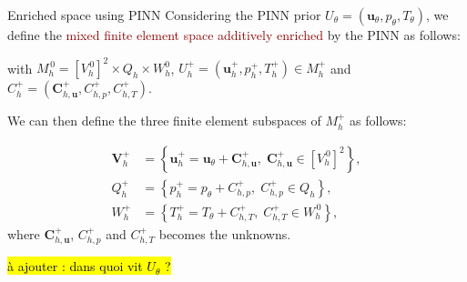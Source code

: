\begin{frame}{Enriched space using PINN} %
    Considering the PINN prior $U_\theta = (\bm{u}_\theta, p_\theta, T_\theta)$, we define the \textcolor{darkred}{mixed finite element space additively enriched} by the PINN as follows:
    
    \begin{center}
    \end{center}

    with $M_h^{\, 0}=[V_h^{\, 0}]^2 \times Q_h \times W_h^0$,
    $U_h^+ = (\bm{u}_h^+, p_h^+, T_h^+) \in M_h^+$ and $C_h^+ = (\bm{C}_{h,\bm{u}}^+, C_{h,p}^+, C_{h,T}^+)$.

    \vspace{8pt}

    We can then define the three finite element subspaces of $M_h^+$ as follows:
    \begin{minipage}{0.6\linewidth}
        \vspace{-15pt}
        \begin{align*}
            \bm{V}_h^+ &= \left\{\bm{u}_h^+ = \bm{u}_\theta + \bm{C}_{h,\bm{u}}^+, \; \bm{C}_{h,\bm{u}}^+ \in [V_h^{\, 0}]^2\right\}, \\
            Q_h^+ &= \left\{p_h^+ = p_\theta + C_{h,p}^+, \; C_{h,p}^+ \in Q_h\right\}, \\
            W_h^+ &= \left\{T_h^+ = T_\theta + C_{h,T}^+, \; C_{h,T}^+ \in W_h^{\, 0}\right\},
        \end{align*}
        where $\bm{C}_{h,\bm{u}}^+$, $C_{h,p}^+$ and $C_{h,T}^+$ becomes the unknowns.
        
        \vspace{5pt}
        \hl{à ajouter : dans quoi vit $U_\theta$ ?}
    \end{minipage}
    \begin{minipage}{0.38\linewidth}
        \centering
        \vspace{5pt}
    \end{minipage}
\end{frame}



